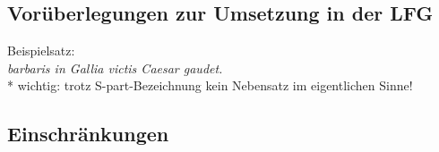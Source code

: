 \documentclass[12pt,a4paper]{article}
\begin{document}
\subsection{Vorüberlegungen zur Umsetzung in der LFG}
Beispielsatz: \\
\textit{barbaris in Gallia victis Caesar gaudet.} \\

* wichtig: trotz S-part-Bezeichnung kein Nebensatz im eigentlichen Sinne!

\subsection{Einschränkungen}

\end{document}
